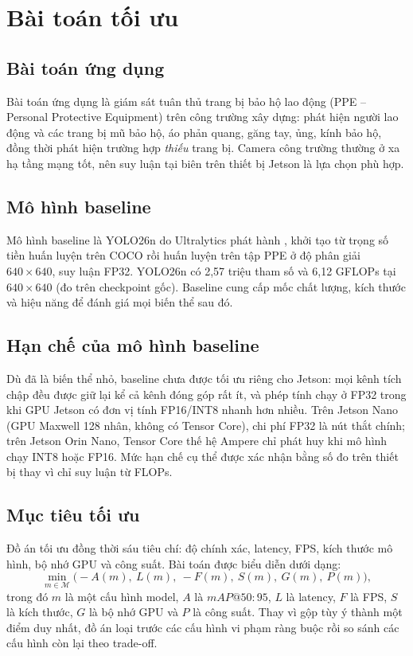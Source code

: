 \section{Bài toán tối ưu}

\subsection{Bài toán ứng dụng}

Bài toán ứng dụng là giám sát tuân thủ trang bị bảo hộ lao động (PPE --
Personal Protective Equipment) trên công trường xây dựng: phát hiện người lao động
và các trang bị mũ bảo hộ, áo phản quang, găng tay, ủng, kính bảo hộ, đồng thời
phát hiện trường hợp \emph{thiếu} trang bị. Camera công trường thường ở xa hạ tầng
mạng tốt, nên suy luận tại biên trên thiết bị Jetson là lựa chọn phù hợp.

\subsection{Mô hình baseline}

Mô hình baseline là YOLO26n do Ultralytics phát hành \cite{ultralytics}, khởi tạo từ trọng số tiền
huấn luyện trên COCO rồi huấn luyện trên tập PPE ở độ phân giải $640\times640$,
suy luận FP32. YOLO26n có 2{,}57 triệu tham số và 6{,}12 GFLOPs tại $640\times640$
(đo trên checkpoint gốc). Baseline cung cấp mốc chất lượng, kích thước và hiệu
năng để đánh giá mọi biến thể sau đó.

\subsection{Hạn chế của mô hình baseline}

Dù đã là biến thể nhỏ, baseline chưa được tối ưu riêng cho Jetson: mọi kênh
tích chập đều được giữ lại kể cả kênh đóng góp rất ít, và phép tính chạy ở FP32
trong khi GPU Jetson có đơn vị tính FP16/INT8 nhanh hơn nhiều. Trên Jetson Nano
(GPU Maxwell 128 nhân, không có Tensor Core), chi phí FP32 là nút thắt chính; trên
Jetson Orin Nano, Tensor Core thế hệ Ampere chỉ phát huy khi mô hình chạy INT8
hoặc FP16. Mức hạn chế cụ thể được xác nhận bằng số đo trên thiết bị thay vì chỉ
suy luận từ FLOPs.

\subsection{Mục tiêu tối ưu}

Đồ án tối ưu đồng thời sáu tiêu chí: độ chính xác, latency, FPS, kích thước mô
hình, bộ nhớ GPU và công suất. Bài toán được biểu diễn dưới dạng:
\begin{equation}
  \min_{m\in\mathcal{M}}
  \bigl(-A(m),\ L(m),\ -F(m),\ S(m),\ G(m),\ P(m)\bigr),
\end{equation}
trong đó $m$ là một cấu hình model, $A$ là $mAP@50{:}95$, $L$ là latency, $F$ là
FPS, $S$ là kích thước, $G$ là bộ nhớ GPU và $P$ là công suất. Thay vì gộp tùy ý
thành một điểm duy nhất, đồ án loại trước các cấu hình vi phạm ràng buộc rồi so
sánh các cấu hình còn lại theo trade-off.

